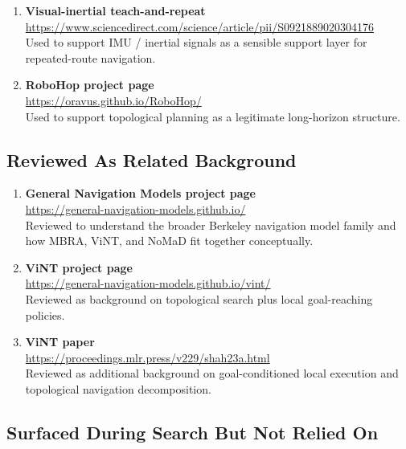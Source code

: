 \documentclass[11pt,a4paper]{article}
\begin{document}
\begin{enumerate}[nosep]
  \item \textbf{Visual-inertial teach-and-repeat} \\
  \url{https://www.sciencedirect.com/science/article/pii/S0921889020304176} \\
  Used to support IMU / inertial signals as a sensible support layer for
  repeated-route navigation.

  \item \textbf{RoboHop project page} \\
  \url{https://oravus.github.io/RoboHop/} \\
  Used to support topological planning as a legitimate long-horizon structure.
\end{enumerate}

\subsection{Reviewed As Related Background}

\begin{enumerate}[nosep]
  \item \textbf{General Navigation Models project page} \\
  \url{https://general-navigation-models.github.io/} \\
  Reviewed to understand the broader Berkeley navigation model family and how
  MBRA, ViNT, and NoMaD fit together conceptually.

  \item \textbf{ViNT project page} \\
  \url{https://general-navigation-models.github.io/vint/} \\
  Reviewed as background on topological search plus local goal-reaching
  policies.

  \item \textbf{ViNT paper} \\
  \url{https://proceedings.mlr.press/v229/shah23a.html} \\
  Reviewed as additional background on goal-conditioned local execution and
  topological navigation decomposition.
\end{enumerate}

\subsection{Surfaced During Search But Not Relied On}
\end{document}
